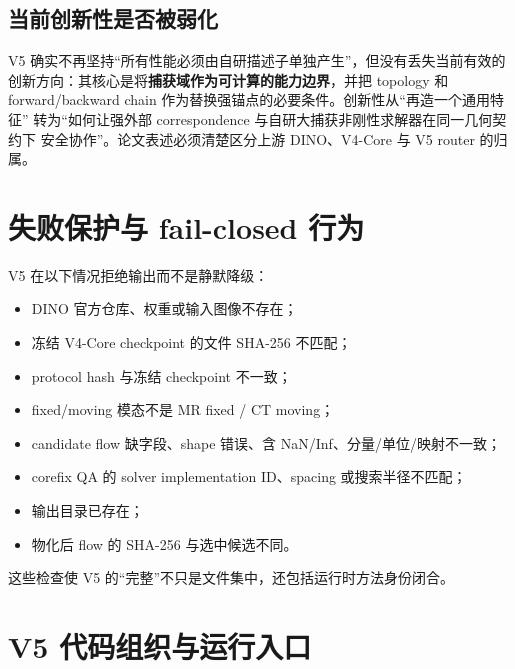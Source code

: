 \documentclass[11pt,a4paper]{ctexart}
\begin{document}
\subsection{当前创新性是否被弱化}
V5 确实不再坚持“所有性能必须由自研描述子单独产生”，但没有丢失当前有效的
创新方向：其核心是将\textbf{捕获域作为可计算的能力边界}，并把 topology 和
forward/backward chain 作为替换强锚点的必要条件。创新性从“再造一个通用特征”
转为“如何让强外部 correspondence 与自研大捕获非刚性求解器在同一几何契约下
安全协作”。论文表述必须清楚区分上游 DINO、V4-Core 与 V5 router 的归属。

\section{失败保护与 fail-closed 行为}

V5 在以下情况拒绝输出而不是静默降级：
\begin{itemize}
  \item DINO 官方仓库、权重或输入图像不存在；
  \item 冻结 V4-Core checkpoint 的文件 SHA-256 不匹配；
  \item protocol hash 与冻结 checkpoint 不一致；
  \item fixed/moving 模态不是 MR fixed / CT moving；
  \item candidate flow 缺字段、shape 错误、含 NaN/Inf、分量/单位/映射不一致；
  \item corefix QA 的 solver implementation ID、spacing 或搜索半径不匹配；
  \item 输出目录已存在；
  \item 物化后 flow 的 SHA-256 与选中候选不同。
\end{itemize}
这些检查使 V5 的“完整”不只是文件集中，还包括运行时方法身份闭合。

\section{V5 代码组织与运行入口}
\end{document}
